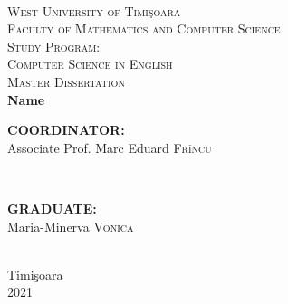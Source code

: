 \documentclass[12pt, a4paper]{report}
\begin{document}
	\begin{titlepage}
		
		\newcommand{\HRule}{\rule{\linewidth}{0.5mm}}
		
		\center
		
		\textsc{}\\[.7cm]
		
		\textsc{\LARGE West University of  Timi\c{s}oara}\\[0.5cm]
		\textsc{\Large Faculty of Mathematics and Computer Science}\\[0.5cm]
		\textsc{\large Study Program: \\Computer Science in English}\\[4.5cm]
		
		\textsc{\Huge Master Dissertation}\\[2cm]
		
		{\Huge \bfseries Name}\\[6cm]
		
		\begin{minipage}{0.4\textwidth}
			\begin{flushleft} \large
				\textbf{COORDINATOR:}\\
				Associate Prof. Marc Eduard \textsc{Frîncu}
			\end{flushleft}
		\end{minipage}
		~
		\begin{minipage}{0.4\textwidth}
			\begin{flushright} \large
				\textbf{GRADUATE:} \\
				Maria-Minerva \textsc{Vonica}
			\end{flushright}
		\end{minipage}\\[0.5cm]
		\vfill
		{\large Timi\c{s}oara\\ 2021}\\
		
		\vfill
		
	\end{titlepage}

	
\end{document}
